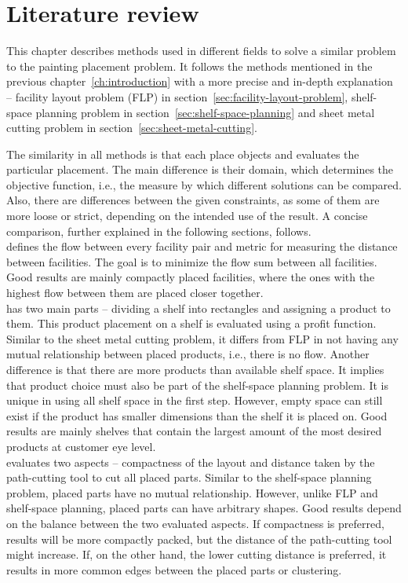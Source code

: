 \chapter{Literature review}\label{ch:literature-review}

This chapter describes methods used in different fields to solve a similar problem to the painting placement problem.
It follows the methods mentioned in the previous chapter~\ref{ch:introduction} with
a more precise and in-depth explanation – facility layout problem (FLP) in section~\ref{sec:facility-layout-problem},
shelf-space planning problem in section~\ref{sec:shelf-space-planning} and sheet metal cutting problem in section~\ref{sec:sheet-metal-cutting}.

The similarity in all methods is that each place objects and evaluates the particular placement.
The main difference is their domain, which determines the objective function, i.e., the measure by which different solutions can be compared.
Also, there are differences between the given constraints, as some of them are more loose or strict,
depending on the intended use of the result.
A concise comparison, further explained in the following sections, follows.\\

 defines the flow between every facility pair and metric for measuring the distance between facilities.
The goal is to minimize the flow sum between all facilities.
Good results are mainly compactly placed facilities, where the ones with the highest flow between them are placed closer together.\\

 has two main parts – dividing a shelf into rectangles and assigning a product to them.
This product placement on a shelf is evaluated using a profit function.
Similar to the sheet metal cutting problem, it differs from FLP
in not having any mutual relationship between placed products, i.e., there is no flow.
Another difference is that there are more products than available shelf space.
It implies that product choice must also be part of the shelf-space planning problem.
It is unique in using all shelf space in the first step.
However, empty space can still exist if the product has smaller dimensions than the shelf it is placed on.
Good results are mainly shelves that contain the largest amount of the most desired products at customer eye level.\\

 evaluates two aspects – compactness of the layout and distance taken by the path-cutting tool to cut all placed parts.
Similar to the shelf-space planning problem, placed parts have no mutual relationship.
However, unlike FLP and shelf-space planning, placed parts can have arbitrary shapes.
Good results depend on the balance between the two evaluated aspects.
If compactness is preferred, results will be more compactly packed, but the distance of the path-cutting tool might increase.
If, on the other hand, the lower cutting distance is preferred, it results in more common edges between the placed parts or clustering.\\





